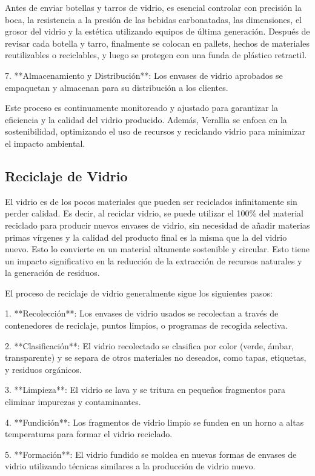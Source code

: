 \documentclass[main.tex]{subfiles}
\begin{document}
Antes de enviar botellas y tarros de vidrio, es esencial controlar con precisión la boca, la resistencia a la presión de las bebidas carbonatadas, las dimensiones, el grosor del vidrio y la estética utilizando equipos de última generación. Después de revisar cada botella y tarro, finalmente se colocan en pallets, hechos de materiales reutilizables o reciclables, y luego se protegen con una funda de plástico retractil.

7. **Almacenamiento y Distribución**: Los envases de vidrio aprobados se empaquetan y almacenan para su distribución a los clientes.

Este proceso es continuamente monitoreado y ajustado para garantizar la eficiencia y la calidad del vidrio producido. Además, Verallia se enfoca en la sostenibilidad, optimizando el uso de recursos y reciclando vidrio para minimizar el impacto ambiental.

\subsection{Reciclaje de Vidrio}

El vidrio es de los pocos materiales que pueden ser reciclados infinitamente sin perder calidad. Es decir, al reciclar vidrio, se puede utilizar el 100\% del material reciclado para producir nuevos envases de vidrio, sin necesidad de añadir materias primas vírgenes y la calidad del producto final es la misma que la del vidrio nuevo. Esto lo convierte en un material altamente sostenible y circular. Esto tiene un impacto significativo en la reducción de la extracción de recursos naturales y la generación de residuos.

El proceso de reciclaje de vidrio generalmente sigue los siguientes pasos:

1. **Recolección**: Los envases de vidrio usados se recolectan a través de contenedores de reciclaje, puntos limpios, o programas de recogida selectiva.

2. **Clasificación**: El vidrio recolectado se clasifica por color (verde, ámbar, transparente) y se separa de otros materiales no deseados, como tapas, etiquetas, y residuos orgánicos.

3. **Limpieza**: El vidrio se lava y se tritura en pequeños fragmentos para eliminar impurezas y contaminantes.

4. **Fundición**: Los fragmentos de vidrio limpio se funden en un horno a altas temperaturas para formar el vidrio reciclado.

5. **Formación**: El vidrio fundido se moldea en nuevas formas de envases de vidrio utilizando técnicas similares a la producción de vidrio nuevo.
\end{document}
